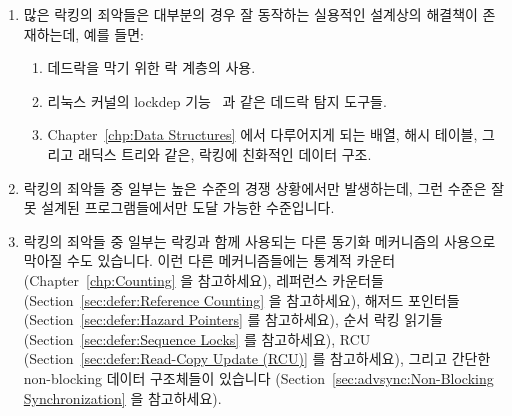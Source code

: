 \begin{enumerate}
\item	많은 락킹의 죄악들은 대부분의 경우 잘 동작하는 실용적인 설계상의
	해결책이 존재하는데, 예를 들면:
	\begin{enumerate}
	\item	데드락을 막기 위한 락 계층의 사용.
	\item	리눅스 커널의 lockdep 기능~\cite{JonathanCorbet2006lockdep} 과
		같은 데드락 탐지 도구들.
	\item	Chapter~\ref{chp:Data Structures} 에서 다루어지게 되는 배열,
		해시 테이블, 그리고 래딕스 트리와 같은, 락킹에 친화적인 데이터
		구조.
	\end{enumerate}
\item	락킹의 죄악들 중 일부는 높은 수준의 경쟁 상황에서만 발생하는데, 그런
	수준은 잘못 설계된 프로그램들에서만 도달 가능한 수준입니다.

\item	락킹의 죄악들 중 일부는 락킹과 함께 사용되는 다른 동기화 메커니즘의
	사용으로 막아질 수도 있습니다.
	이런 다른 메커니즘들에는 통계적 카운터
	(Chapter~\ref{chp:Counting} 을 참고하세요),
	레퍼런스 카운터들
	(Section~\ref{sec:defer:Reference Counting} 을 참고하세요),
	해저드 포인터들
	(Section~\ref{sec:defer:Hazard Pointers} 를 참고하세요),
	순서 락킹 읽기들
	(Section~\ref{sec:defer:Sequence Locks} 를 참고하세요),
	RCU
	(Section~\ref{sec:defer:Read-Copy Update (RCU)} 를 참고하세요),
	그리고 간단한 non-blocking 데이터 구조체들이 있습니다
	(Section~\ref{sec:advsync:Non-Blocking Synchronization} 을 참고하세요).
\iffalse


\end{enumerate}
